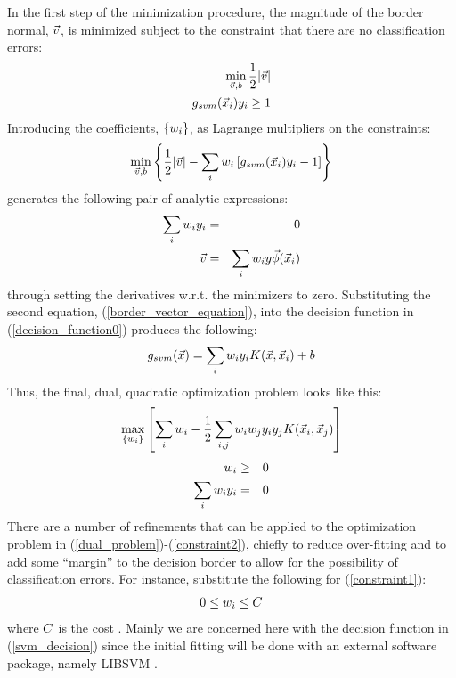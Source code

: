 In the first step of the minimization procedure, 
the magnitude of the border normal, $\vec v$, 
is minimized subject to the constraint that there are no classification 
errors:
\begin{eqnarray*}
	\min_{\vec v, b} \frac{1}{2} | \vec v | \\ \nonumber
	g_{svm}(\vec {x}_i) y_i \ge 1
\end{eqnarray*}
Introducing the coefficients, $\lbrace w_i \rbrace$, 
as Lagrange multipliers on the constraints:
\begin{equation}
	\min_{\vec v, b} \left \lbrace \frac{1}{2} | \vec v | - \sum_i w_i \left [ g_{svm}(\vec {x}_i) y_i -1 \right ] \right \rbrace
\end{equation}
generates the following pair of analytic expressions:
\begin{eqnarray}
	\sum_i w_i y_i & = & 0 \\
	\vec v & = & \sum_i w_i y \vec\phi(\vec {x}_i) \label{border_vector_equation}
\end{eqnarray}
through setting the derivatives w.r.t. the minimizers to zero.
Substituting the second equation, (\ref{border_vector_equation}),
into the decision function in (\ref{decision_function0}) produces the following:
\begin{equation}
	g_{svm}(\vec {x}) = \sum_i w_i y_i K (\vec {x}, \vec {x}_i) + b
	\label{svm_decision}
\end{equation}
Thus, the final, dual, quadratic optimization problem looks like this:
\begin{equation}
	\max_{\lbrace w_i \rbrace} \left [ \sum_i w_i 
	- \frac{1}{2} \sum_{i, j} w_i w_j y_i y_j K(\vec {x}_i, \vec {x}_j) \right ] \label{dual_problem}
\end{equation}
\begin{eqnarray}
	w_i & \ge & 0 \label{constraint1} \\
	\sum_i w_i y_i & = & 0 \label{constraint2}
\end{eqnarray}
There are a number of refinements that can be applied to the optimization
problem in (\ref{dual_problem})-(\ref{constraint2}), chiefly to reduce over-fitting and to add
some ``margin'' to the decision border to allow for the possibility of
classification errors.
For instance, substitute the following for (\ref{constraint1}):
\begin{equation}
 0 \le w_i \le C
 \label{svmcost}
\end{equation}
where $C$ is the cost \citep{Mueller_etal2001}.
Mainly we are concerned here with the decision
function in (\ref{svm_decision}) since the initial fitting will be done with
an external software package, namely LIBSVM \citep{Chang_Lin2011}.

